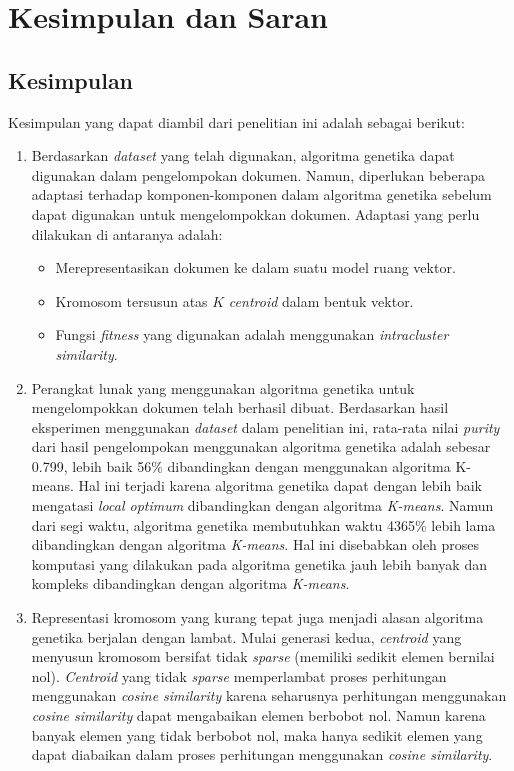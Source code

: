 \chapter{Kesimpulan dan Saran}
\label{chap:kesimpulan}

\section{Kesimpulan}
Kesimpulan yang dapat diambil dari penelitian ini adalah sebagai berikut:

\begin{enumerate}
	\item Berdasarkan \textit{dataset} yang telah digunakan, algoritma genetika dapat digunakan dalam pengelompokan dokumen. Namun, diperlukan beberapa adaptasi terhadap komponen-komponen dalam algoritma genetika sebelum dapat digunakan untuk mengelompokkan dokumen. Adaptasi yang perlu dilakukan di antaranya adalah:
	\begin{itemize}
		\item Merepresentasikan dokumen ke dalam suatu model ruang vektor.
		\item Kromosom tersusun atas $K$ \textit{centroid} dalam bentuk vektor.
		\item Fungsi \textit{fitness} yang digunakan adalah menggunakan \textit{intracluster similarity}.
	\end{itemize}
	\item Perangkat lunak yang menggunakan algoritma genetika untuk mengelompokkan dokumen telah berhasil dibuat. Berdasarkan hasil eksperimen menggunakan \textit{dataset} dalam penelitian ini, rata-rata nilai \textit{purity} dari hasil pengelompokan menggunakan algoritma genetika adalah sebesar 0.799, lebih baik 56\% dibandingkan dengan menggunakan algoritma K-means. Hal ini terjadi karena algoritma genetika dapat dengan lebih baik mengatasi \textit{local optimum} dibandingkan dengan algoritma \textit{K-means}. Namun dari segi waktu, algoritma genetika membutuhkan waktu 4365\% lebih lama dibandingkan dengan algoritma \textit{K-means}. Hal ini disebabkan oleh proses komputasi yang dilakukan pada algoritma genetika jauh lebih banyak dan kompleks dibandingkan dengan algoritma \textit{K-means}.
	\item Representasi kromosom yang kurang tepat juga menjadi alasan algoritma genetika berjalan dengan lambat. Mulai generasi kedua, \textit{centroid} yang menyusun kromosom bersifat tidak \textit{sparse} (memiliki sedikit elemen bernilai nol). \textit{Centroid} yang tidak \textit{sparse} memperlambat proses perhitungan menggunakan \textit{cosine similarity} karena seharusnya perhitungan menggunakan \textit{cosine similarity} dapat mengabaikan elemen berbobot nol. Namun karena banyak elemen yang tidak berbobot nol, maka hanya sedikit elemen yang dapat diabaikan dalam proses perhitungan menggunakan \textit{cosine similarity}.

\end{enumerate}
